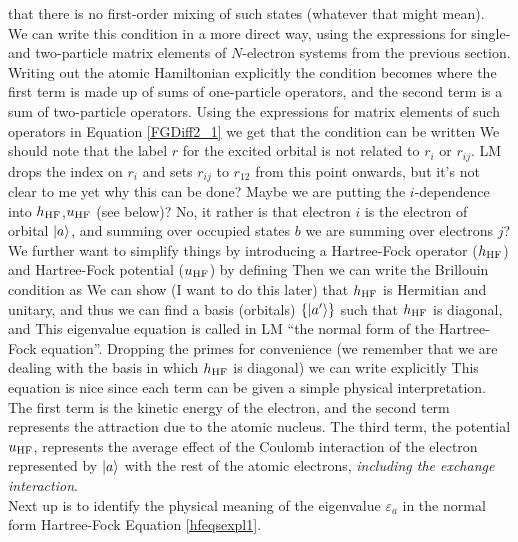 that there is no first-order mixing of such states (whatever that might mean).\\
\indent We can write this condition in a more direct way, using the expressions for single- and two-particle matrix elements of $N$-electron systems from the previous section. Writing out the atomic Hamiltonian explicitly the condition becomes
where the first term is made up of sums of one-particle operators, and the second term is a sum of two-particle operators. Using the expressions for matrix elements of such operators in Equation \eqref{FGDiff2_1} we get that the condition can be written
We should note that the label $r$ for the excited orbital is not related to $r_i$ or $r_{ij}$. LM drops the index on $r_i$ and sets $r_{ij}$ to $r_{12}$ from this point onwards, but it's not clear to me yet why this can be done? Maybe we are putting the $i$-dependence into $h_{\text{HF}}$,$u_{\text{HF}}$ (see below)? No, it rather is that electron $i$ is the electron of orbital $\ket{a}$, and summing over occupied states $b$ we are summing over electrons $j$?\\
\indent We further want to simplify things by introducing a Hartree-Fock operator ($h_{\text{HF}}$) and Hartree-Fock potential ($u_{\text{HF}}$) by defining
Then we can write the Brillouin condition as
We can show (I want to do this later) that $h_{\text{HF}}$ is Hermitian and unitary, and thus we can find a basis (orbitals) $\{\ket{a'}\}$ such that $h_{\text{HF}}$ is diagonal, and
This eigenvalue equation is called in LM ``the normal form of the Hartree-Fock equation''. Dropping the primes for convenience (we remember that we are dealing with the basis in which $h_{\text{HF}}$ is diagonal) we can write explicitly
This equation is nice since each term can be given a simple physical interpretation. The first term is the kinetic energy of the electron, and the second term represents the attraction due to the atomic nucleus. The third term, the potential $u_{\text{HF}}$, represents the average effect of the Coulomb interaction of the electron represented by $\ket{a}$ with the rest of the atomic electrons, \emph{including the exchange interaction}.\\
\indent Next up is to identify the physical meaning of the eigenvalue $\varepsilon_a$ in the normal form Hartree-Fock Equation \eqref{hfeqsexpl1}.

